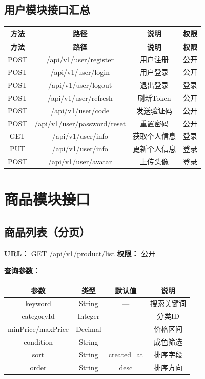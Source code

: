 \documentclass[12pt,a4paper,UTF8]{ctexart}
\begin{document}
\subsection{用户模块接口汇总}

\begin{longtable}{|c|c|c|c|}
    \hline
    \textbf{方法} & \textbf{路径} & \textbf{说明} & \textbf{权限} \\
    \hline
    \endfirsthead
    \hline
    \textbf{方法} & \textbf{路径} & \textbf{说明} & \textbf{权限} \\
    \hline
    \endhead
    \hline
    \endfoot

    POST & /api/v1/user/register & 用户注册 & 公开 \\
    \hline
    POST & /api/v1/user/login & 用户登录 & 公开 \\
    \hline
    POST & /api/v1/user/logout & 退出登录 & 登录 \\
    \hline
    POST & /api/v1/user/refresh & 刷新Token & 公开 \\
    \hline
    POST & /api/v1/user/code & 发送验证码 & 公开 \\
    \hline
    POST & /api/v1/user/password/reset & 重置密码 & 公开 \\
    \hline
    GET & /api/v1/user/info & 获取个人信息 & 登录 \\
    \hline
    PUT & /api/v1/user/info & 更新个人信息 & 登录 \\
    \hline
    POST & /api/v1/user/avatar & 上传头像 & 登录 \\
    \hline
\end{longtable}

\section{商品模块接口}

\subsection{商品列表（分页）}

\textbf{URL：} GET /api/v1/product/list \hfill \textbf{权限：} 公开

\textbf{查询参数：}

\begin{longtable}{|c|c|c|c|}
    \hline
    \textbf{参数} & \textbf{类型} & \textbf{默认值} & \textbf{说明} \\
    \hline
    \endhead
    \hline
    \endfoot

    keyword & String & --- & 搜索关键词 \\
    \hline
    categoryId & Integer & --- & 分类ID \\
    \hline
    minPrice/maxPrice & Decimal & --- & 价格区间 \\
    \hline
    condition & String & --- & 成色筛选 \\
    \hline
    sort & String & created\_at & 排序字段 \\
    \hline
    order & String & desc & 排序方向 \\
    \hline
\end{longtable}
\end{document}
